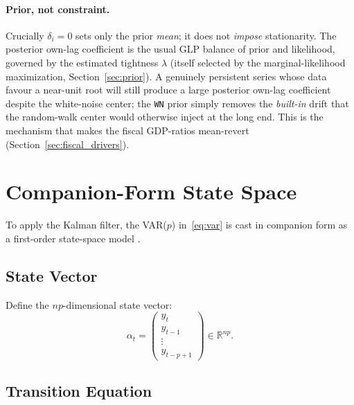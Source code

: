 \documentclass[11pt]{article}
\newcommand{\R}{\mathbb{R}}
\theoremstyle{definition}
\theoremstyle{remark}
\begin{document}
\paragraph{Prior, not constraint.} Crucially $\delta_i=0$ sets only the
prior \emph{mean}; it does not \emph{impose} stationarity. The posterior
own-lag coefficient is the usual GLP balance of prior and likelihood,
governed by the estimated tightness $\lambda$ (itself selected by the
marginal-likelihood maximization, Section~\ref{sec:prior}). A genuinely
persistent series whose data favour a near-unit root will still produce a
large posterior own-lag coefficient despite the white-noise center; the
\texttt{WN} prior simply removes the \emph{built-in} drift that the
random-walk center would otherwise inject at the long end. This is the
mechanism that makes the fiscal GDP-ratios mean-revert
(Section~\ref{sec:fiscal_drivers}).


\section{Companion-Form State Space}\label{sec:statespace}

To apply the Kalman filter, the VAR($p$) in~\eqref{eq:var} is cast in
companion form as a first-order state-space model
\citep[see, e.g.,][ch.~3]{DurbinKoopman2012}.

\subsection{State Vector}

Define the $np$-dimensional state vector:
\begin{equation}\label{eq:state}
  \alpha_t = \begin{pmatrix} y_t \\ y_{t-1} \\ \vdots \\ y_{t-p+1}
  \end{pmatrix} \in \R^{np}.
\end{equation}

\subsection{Transition Equation}
\end{document}
